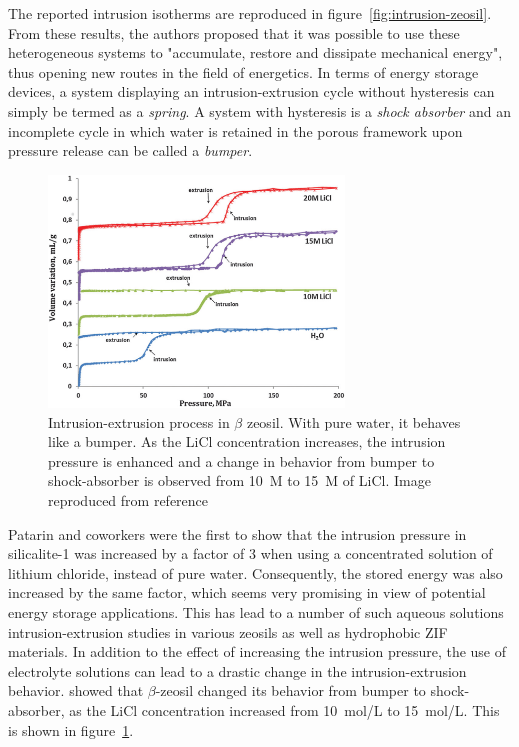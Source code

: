 \documentclass[thesis]{subfiles}
\begin{document}
The reported intrusion isotherms are reproduced in
figure~\ref{fig:intrusion-zeosil}. From these results, the authors proposed that
it was possible to use these heterogeneous systems to "accumulate, restore and
dissipate mechanical energy", thus opening new routes in the field of
energetics. In terms of energy storage devices, a system displaying an
intrusion-extrusion cycle without hysteresis can simply be termed as a
\emph{spring}. A system with hysteresis is a \emph{shock absorber} and an
incomplete cycle in which water is retained in the porous framework upon
pressure release can be called a \emph{bumper}.

\begin{figure}[ht]
    \centering
    \includegraphics[width=0.7\textwidth]{figures/cited/intrusion-licl}
    \caption{Intrusion-extrusion process in $\beta$ zeosil. With pure water, it
    behaves like a bumper. As the LiCl concentration increases, the intrusion
    pressure is enhanced and a change in behavior from bumper to shock-absorber
    is observed from 10~M to 15~M of LiCl. Image reproduced from
    reference~\cite{Ryzhikov2014}}
    \label{fig:intrusion-licl}
\end{figure}

Patarin and coworkers\cite{Tzanis2014, Khay2014} were the first to show that the
intrusion pressure in silicalite-1 was increased by a factor of 3 when using a
concentrated solution of lithium chloride, instead of pure water. Consequently,
the stored energy was also increased by the same factor, which seems very
promising in view of potential energy storage applications. This has lead to a
number of such aqueous solutions intrusion-extrusion studies in various zeosils
as well as hydrophobic ZIF materials. In addition to the effect of increasing
the intrusion pressure, the use of electrolyte solutions can lead to a drastic
change in the intrusion-extrusion behavior.
\citeauthor{Ryzhikov2014}\cite{Ryzhikov2014} showed that $\beta$-zeosil changed
its behavior from bumper to shock-absorber, as the LiCl concentration increased
from \SI{10}{mol/L} to \SI{15}{mol/L}. This is shown in
figure~\ref{fig:intrusion-licl}.
\end{document}
